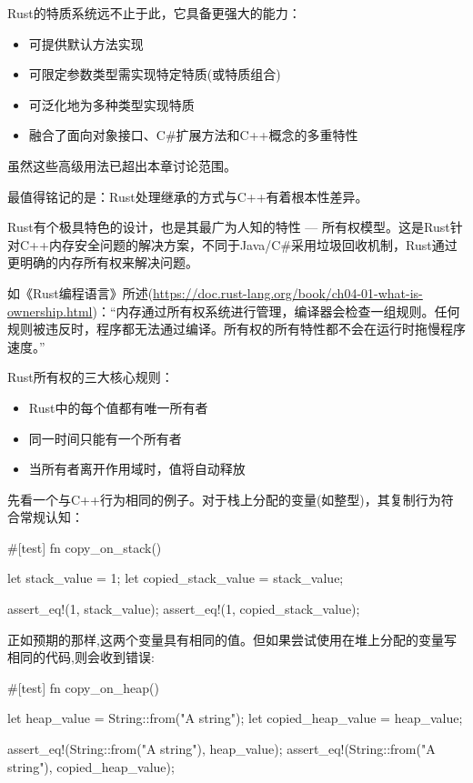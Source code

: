 Rust的特质系统远不止于此，它具备更强大的能力：

\begin{itemize}
\item 
可提供默认方法实现

\item 
可限定参数类型需实现特定特质(或特质组合)

\item 
可泛化地为多种类型实现特质

\item 
融合了面向对象接口、C\#扩展方法和C++概念的多重特性
\end{itemize}

虽然这些高级用法已超出本章讨论范围。

最值得铭记的是：Rust处理继承的方式与C++有着根本性差异。


Rust有个极具特色的设计，也是其最广为人知的特性 --- 所有权模型。这是Rust针对C++内存安全问题的解决方案，不同于Java/C\#采用垃圾回收机制，Rust通过更明确的内存所有权来解决问题。

如《Rust编程语言》所述(\url{https://doc.rust-lang.org/book/ch04-01-what-is-ownership.html})：“内存通过所有权系统进行管理，编译器会检查一组规则。任何规则被违反时，程序都无法通过编译。所有权的所有特性都不会在运行时拖慢程序速度。”

Rust所有权的三大核心规则：

\begin{itemize}
\item 
Rust中的每个值都有唯一所有者

\item 
同一时间只能有一个所有者

\item 
当所有者离开作用域时，值将自动释放
\end{itemize}

先看一个与C++行为相同的例子。对于栈上分配的变量(如整型)，其复制行为符合常规认知：

\begin{rust}
#[test]
fn copy_on_stack() {
  let stack_value = 1;
  let copied_stack_value = stack_value;

  assert_eq!(1, stack_value);
  assert_eq!(1, copied_stack_value);
}
\end{rust}

正如预期的那样,这两个变量具有相同的值。但如果尝试使用在堆上分配的变量写相同的代码,则会收到错误:

\begin{rust}
#[test]
fn copy_on_heap() {
  let heap_value = String::from("A string");
  let copied_heap_value = heap_value;

  assert_eq!(String::from("A string"), heap_value);
  assert_eq!(String::from("A string"), copied_heap_value);
}
\end{rust}

